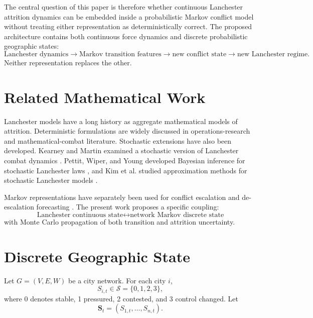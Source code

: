 \documentclass[11pt,letterpaper]{article}
\begin{document}
The central question of this paper is therefore whether continuous Lanchester attrition dynamics can be embedded inside a probabilistic Markov conflict model without treating either representation as deterministically correct. The proposed architecture contains both continuous force dynamics and discrete probabilistic geographic states:
\begin{equation}
\text{Lanchester dynamics}\rightarrow\text{Markov transition features}\rightarrow\text{new conflict state}\rightarrow\text{new Lanchester regime}.
\end{equation}
Neither representation replaces the other.

\section{Related Mathematical Work}
Lanchester models have a long history as aggregate mathematical models of attrition. Deterministic formulations are widely discussed in operations-research and mathematical-combat literature. Stochastic extensions have also been developed. Kearney and Martin examined a stochastic version of Lanchester combat dynamics \citep{kearney2019}. Pettit, Wiper, and Young developed Bayesian inference for stochastic Lanchester laws \citep{pettit2003}, and Kim et al. studied approximation methods for stochastic Lanchester models \citep{kim2017}.

Markov representations have separately been used for conflict escalation and de-escalation forecasting \citep{randahl2022}. The present work proposes a specific coupling:
\begin{equation}
\boxed{\text{Lanchester continuous state}\leftrightarrow\text{network Markov discrete state}}
\end{equation}
with Monte Carlo propagation of both transition and attrition uncertainty.

\section{Discrete Geographic State}
Let $G=(V,E,W)$ be a city network. For each city $i$,
\begin{equation}
S_{i,t}\in\mathcal{S}=\{0,1,2,3\},
\end{equation}
where 0 denotes stable, 1 pressured, 2 contested, and 3 control changed. Let
\begin{equation}
\mathbf{S}_t=(S_{1,t},\ldots,S_{n,t}).
\end{equation}
\end{document}
